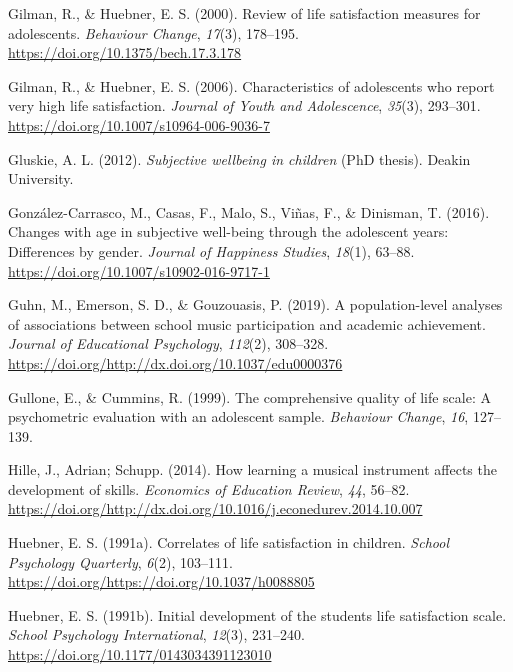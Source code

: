 \documentclass[a4, 12pt]{article}
\begin{document}
\leavevmode\hypertarget{ref-Gilman2000}{}%
Gilman, R., \& Huebner, E. S. (2000). Review of life satisfaction measures for adolescents. \emph{Behaviour Change}, \emph{17}(3), 178--195. \url{https://doi.org/10.1375/bech.17.3.178}

\leavevmode\hypertarget{ref-Gilman2006}{}%
Gilman, R., \& Huebner, E. S. (2006). Characteristics of adolescents who report very high life satisfaction. \emph{Journal of Youth and Adolescence}, \emph{35}(3), 293--301. \url{https://doi.org/10.1007/s10964-006-9036-7}

\leavevmode\hypertarget{ref-Gluskie2012}{}%
Gluskie, A. L. (2012). \emph{Subjective wellbeing in children} (PhD thesis). Deakin University.

\leavevmode\hypertarget{ref-GonzalezCarrasco2016}{}%
González-Carrasco, M., Casas, F., Malo, S., Viñas, F., \& Dinisman, T. (2016). Changes with age in subjective well-being through the adolescent years: Differences by gender. \emph{Journal of Happiness Studies}, \emph{18}(1), 63--88. \url{https://doi.org/10.1007/s10902-016-9717-1}

\leavevmode\hypertarget{ref-Guhn2019}{}%
Guhn, M., Emerson, S. D., \& Gouzouasis, P. (2019). A population-level analyses of associations between school music participation and academic achievement. \emph{Journal of Educational Psychology}, \emph{112}(2), 308--328. \url{https://doi.org/http://dx.doi.org/10.1037/edu0000376}

\leavevmode\hypertarget{ref-Gullone1999}{}%
Gullone, E., \& Cummins, R. (1999). The comprehensive quality of life scale: A psychometric evaluation with an adolescent sample. \emph{Behaviour Change}, \emph{16}, 127--139.

\leavevmode\hypertarget{ref-Hille2014}{}%
Hille, J., Adrian; Schupp. (2014). How learning a musical instrument affects the development of skills. \emph{Economics of Education Review}, \emph{44}, 56--82. \url{https://doi.org/http://dx.doi.org/10.1016/j.econedurev.2014.10.007}

\leavevmode\hypertarget{ref-Huebner1991}{}%
Huebner, E. S. (1991a). Correlates of life satisfaction in children. \emph{School Psychology Quarterly}, \emph{6}(2), 103--111. \url{https://doi.org/https://doi.org/10.1037/h0088805}

\leavevmode\hypertarget{ref-Huebner1991a}{}%
Huebner, E. S. (1991b). Initial development of the students life satisfaction scale. \emph{School Psychology International}, \emph{12}(3), 231--240. \url{https://doi.org/10.1177/0143034391123010}
\end{document}
